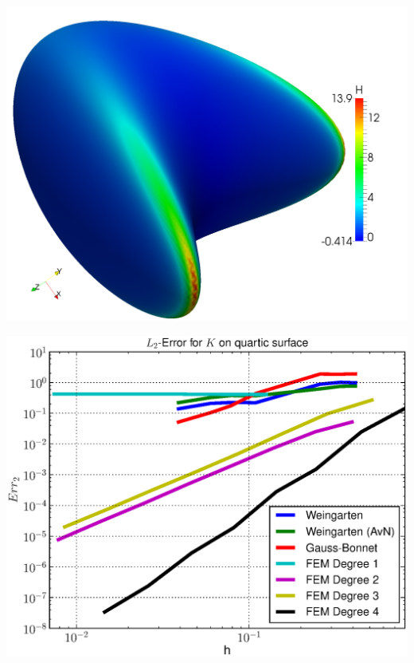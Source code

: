 \documentclass{beamer}
\begin{document}
\begin{frame}
\begin{overprint}
\begin{minipage}[t]{0.49\textwidth}
              \centering\includegraphics[width=\textwidth]{bilder/Curvature/heineB/H250k.png}
          \end{minipage}
          \begin{minipage}[t]{0.49\textwidth}
              \centering\includegraphics[width=\textwidth]{bilder/Curvature/heineB/ErrKL2.eps}
          \end{minipage}\hfill
          \begin{minipage}[t]{0.49\textwidth}

\end{minipage}
\end{overprint}
\end{frame}
\end{document}
